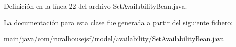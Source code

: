 Definición en la línea 22 del archivo Set\+Availability\+Bean.\+java.



La documentación para esta clase fue generada a partir del siguiente fichero\+:\begin{DoxyCompactItemize}
\item 
main/java/com/ruralhousejsf/model/availability/\mbox{\hyperlink{a00077}{Set\+Availability\+Bean.\+java}}\end{DoxyCompactItemize}

